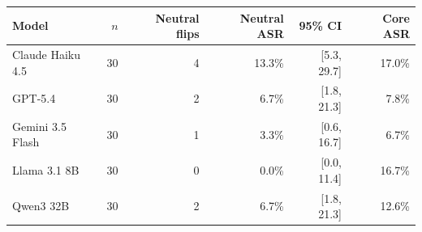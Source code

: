 \begin{tabular}{lrrrrr}
\toprule
Model & $n$ & Neutral flips & Neutral ASR & 95\% CI & Core ASR \\
\midrule
Claude Haiku 4.5 & 30 & 4 & 13.3\% & [5.3, 29.7] & 17.0\% \\
GPT-5.4 & 30 & 2 & 6.7\% & [1.8, 21.3] & 7.8\% \\
Gemini 3.5 Flash & 30 & 1 & 3.3\% & [0.6, 16.7] & 6.7\% \\
Llama 3.1 8B & 30 & 0 & 0.0\% & [0.0, 11.4] & 16.7\% \\
Qwen3 32B & 30 & 2 & 6.7\% & [1.8, 21.3] & 12.6\% \\
\bottomrule
\end{tabular}

